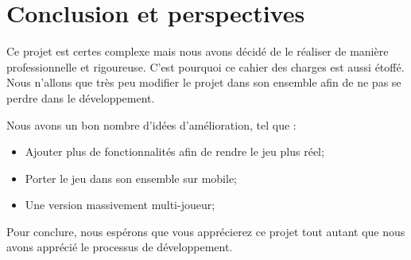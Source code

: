 \chapter*{Conclusion et perspectives}
\label{sec:conclusion}

    Ce projet est certes complexe mais nous avons décidé de le réaliser de manière professionnelle et rigoureuse. C'est pourquoi ce cahier des charges est aussi étoffé. Nous n'allons que très peu modifier le projet dans son ensemble afin de ne pas se perdre dans le développement.
    
    Nous avons un bon nombre d'idées d'amélioration, tel que :
    \begin{itemize}
        \item Ajouter plus de fonctionnalités afin de rendre le jeu plus réel;
        \item Porter le jeu dans son ensemble sur mobile;
        \item Une version massivement multi-joueur;
    \end{itemize}
    
    Pour conclure, nous espérons que vous apprécierez ce projet tout autant que nous avons apprécié le processus de développement.
    

